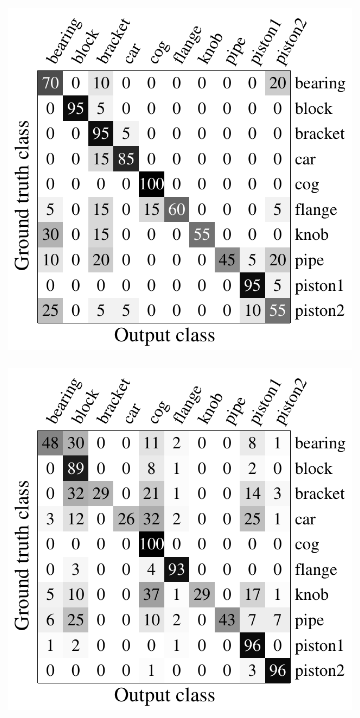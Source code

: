 \begin{figure}[ht]
	\centering
	\begin{subfigure}[t]{0.32\linewidth}
		\label{fig/reg/confusion_sap}
		\includegraphics[width=1\linewidth]{fig/reg/confusion_sap.pdf}
	\end{subfigure}
	\begin{subfigure}[t]{0.32\linewidth}
		\label{fig/reg/confusion_meanshift}
		\includegraphics[width=1\linewidth]{fig/reg/confusion_meanshift.pdf}

\end{subfigure}
\end{figure}
